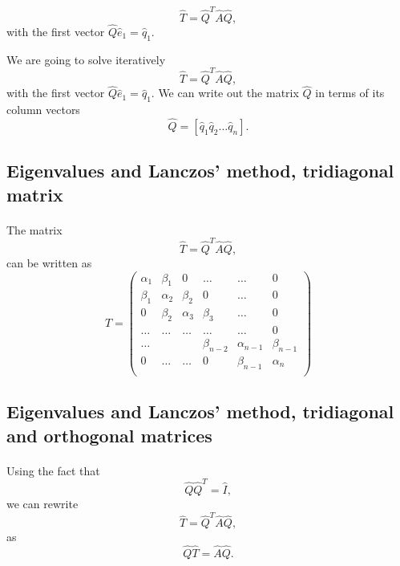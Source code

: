 \documentclass[%
oneside,                 %
final,                   %
10pt]{article}
\begin{document}
\noindent
\[
\hat{T}= \hat{Q}^{T}\hat{A}\hat{Q},
\]
with the first vector $\hat{Q}\hat{e}_1=\hat{q}_1$.

We are going to solve iteratively
\[
\hat{T}= \hat{Q}^{T}\hat{A}\hat{Q},
\]
with the first vector $\hat{Q}\hat{e}_1=\hat{q}_1$.
We can write out the matrix $\hat{Q}$ in terms of its column vectors 
\[
\hat{Q}=\left[\hat{q}_1\hat{q}_2\dots\hat{q}_n\right].
\]



\subsection*{Eigenvalues and Lanczos' method, tridiagonal matrix}

\paragraph{}
The matrix
\[
\hat{T}= \hat{Q}^{T}\hat{A}\hat{Q},
\]
can be written as 
\[
    \hat{T} = \left(\begin{array}{cccccc}
                           \alpha_1& \beta_1 & 0 &\dots   & \dots &0 \\
                           \beta_1 & \alpha_2 & \beta_2 &0 &\dots &0 \\
                           0& \beta_2 & \alpha_3 & \beta_3 & \dots &0 \\
                           \dots& \dots   & \dots &\dots   &\dots & 0 \\
                           \dots&   &  &\beta_{n-2}  &\alpha_{n-1}& \beta_{n-1} \\
                           0&  \dots  &\dots  &0   &\beta_{n-1} & \alpha_{n} \\
                      \end{array} \right)
\]



\subsection*{Eigenvalues and Lanczos' method, tridiagonal and orthogonal matrices}

\paragraph{}
Using the fact that 
\[
\hat{Q}\hat{Q}^T=\hat{I}, 
\]
we can rewrite 
\[
\hat{T}= \hat{Q}^{T}\hat{A}\hat{Q},
\]
as 
\[
\hat{Q}\hat{T}= \hat{A}\hat{Q}.
\]
\end{document}
